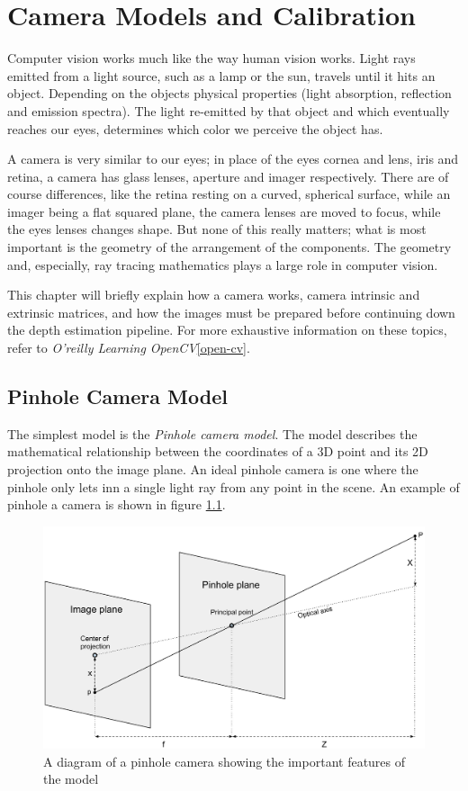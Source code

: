 \chapter{Camera Models and Calibration}

Computer vision works much like the way human vision works. Light rays emitted
from a light source, such as a lamp or the sun, travels until it hits an
object. Depending on the objects physical properties (light absorption,
reflection and emission spectra). The light re-emitted by that object and
which eventually reaches our eyes, determines which color we perceive the
object has.

A camera is very similar to our eyes; in place of the eyes cornea and lens,
iris and retina, a camera has glass lenses, aperture and imager respectively.
There are of course differences, like the retina resting on a curved,
spherical surface, while an imager being a flat squared plane, the camera
lenses are moved to focus, while the eyes lenses changes shape. But none of
this really matters; what is most important is the geometry of the arrangement
of the components. The geometry and, especially, ray tracing mathematics plays
a large role in computer vision.

This chapter will briefly explain how a camera works, camera intrinsic and
extrinsic matrices, and how the images must be prepared before continuing down
the depth estimation pipeline. For more exhaustive information on these
topics, refer to \emph{O'reilly Learning OpenCV}\ref{open-cv}.

\section{Pinhole Camera Model}

The simplest model is the \textit{Pinhole camera model}. The model describes
the mathematical relationship between the coordinates of a 3D point and its 2D
projection onto the image plane. An ideal pinhole camera is one where the
pinhole only lets inn a single light ray from any point in the scene.  An
example of pinhole a camera is shown in figure \ref{fig:pinhole-camera-model}.

\begin{figure}[h]
  \centering
  \label{fig:pinhole-camera-model}
  \includegraphics[width=\textwidth]{images/Pinhole-camera-model.pdf}
  \caption{A diagram of a pinhole camera showing the important features of the model}
\end{figure}

